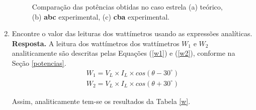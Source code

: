 \documentclass[a4paper,12pt,oneside,openany,table,xcdraw]{article}
\begin{document}
\begin{enumerate}[1)]
\begin{figure}[H]
\centering
\captionsetup{font=scriptsize}
\hfill
{}\hfill
{}
\caption{Comparação das potências obtidas no caso estrela (a) teórico, (b) \textbf{abc} experimental, (c) \textbf{cba} experimental.}
\label{pot-tab1}
\end{figure}


\item  Encontre o valor das leituras dos wattímetros usando as expressões analíticas. \\
\textbf{Resposta.} A leitura dos wattímetros dos wattímetros $W_1$ e $W_2$ analiticamente são descritas pelas Equações (\ref{w1}) e (\ref{w2}), conforme na Seção \ref{potencias}.
\begin{gather}
W_1 = V_L \times I_L \times cos(\theta - 30^\circ)\label{w1}\\
W_2 = V_L \times I_L \times cos(\theta + 30^\circ)\label{w2}
\end{gather}

Assim, analiticamente tem-se os resultados da Tabela \ref{w}.


\end{enumerate}
\end{document}
